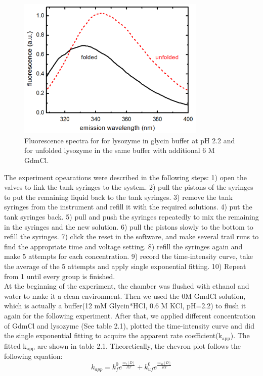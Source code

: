 \documentclass[a4paper,english,12pt,bibliography=totoc]{scrreprt}
\begin{document}
\begin{figure}[H]
    \centering
    \includegraphics[width = 0.8\textwidth]{Images/RedShift_real.png}
    \caption{Fluorescence spectra for for lysozyme in glycin buffer at pH 2.2 and for unfolded lysozyme in the same buffer with additional 6 M GdmCl. \cite{BiophysicsLabCourse}}
    \label{fig:enter-label}
\end{figure}
The experiment opearations were described in the following steps: 1) open the valves to link the tank syringes to the system. 2) pull the pistons of the syringes to put the remaining liquid back to the tank syringes. 3) remove the tank syringes from the instrument and refill it with the required solutions. 4) put the tank syringes back. 5) pull and push the syringes repeatedly to mix the remaining in the syringes and the new solution. 6) pull the pistons slowly to the bottom to refill the syringes. 7) click the reset in the software, and make several trail runs to find the appropriate time and voltage setting. 8) refill the syringes again and make 5 attempts for each concentration. 9) record the time-intensity curve, take the average of the 5 attempts and apply single exponential fitting. 10) Repeat from 1 until every group is finished.\\

At the beginning of the experiment, the chamber was flushed with ethanol and water to make it a clean environment. Then we used the 0M GmdCl solution, which is actually a buffer(12 mM Glycin*HCl, 0.6 M KCl, pH=2.2) to flush it again for the following experiment. After that, we applied different concentration of GdmCl and lysozyme (See table 2.1), plotted the time-intensity curve and did the single exponential fitting to acquire the apparent rate coefficient($\mathrm{k_{app}}$). The fitted $\mathrm{k_{app}}$ are shown in table 2.1. Theoretically, the chevron plot follows the following equation:
\[
k_{app} = k^0_fe^{\frac{m_f[D]}{RT}} + k^0_{uf}e^{\frac{m_{uf}[D]}{RT}}
\]
\end{document}
